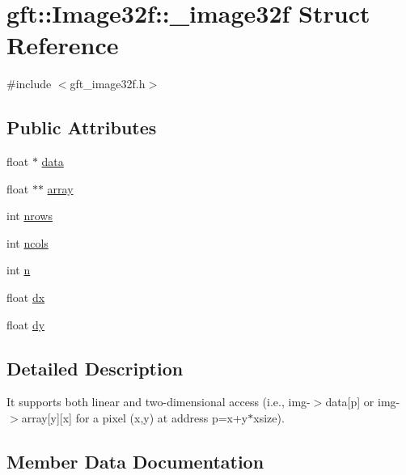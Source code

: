 \hypertarget{structgft_1_1Image32f_1_1__image32f}{}\section{gft\+:\+:Image32f\+:\+:\+\_\+image32f Struct Reference}
\label{structgft_1_1Image32f_1_1__image32f}


{\ttfamily \#include $<$gft\+\_\+image32f.\+h$>$}

\subsection*{Public Attributes}
\begin{DoxyCompactItemize}
\item 
float $\ast$ \hyperlink{structgft_1_1Image32f_1_1__image32f_acfb534bc753690f73f8611bb330b6981}{data}
\item 
float $\ast$$\ast$ \hyperlink{structgft_1_1Image32f_1_1__image32f_aebbb1419c99eba1ae8c14ae2fcb66ed3}{array}
\item 
int \hyperlink{structgft_1_1Image32f_1_1__image32f_ae048a9c4a6d33d48ce69da13cd0ecd15}{nrows}
\item 
int \hyperlink{structgft_1_1Image32f_1_1__image32f_aa5a18afe7e4363fa9ddcdf54a2126605}{ncols}
\item 
int \hyperlink{structgft_1_1Image32f_1_1__image32f_a537587a8a745eae8c71e6753af64d4e1}{n}
\item 
float \hyperlink{structgft_1_1Image32f_1_1__image32f_a93555e01aa1ad19a74079526cc033d1e}{dx}
\item 
float \hyperlink{structgft_1_1Image32f_1_1__image32f_a39c9ee2df99728fe7047f46e49721795}{dy}
\end{DoxyCompactItemize}


\subsection{Detailed Description}
It supports both linear and two-\/dimensional access (i.\+e., img-\/$>$data\mbox{[}p\mbox{]} or img-\/$>$array\mbox{[}y\mbox{]}\mbox{[}x\mbox{]} for a pixel (x,y) at address p=x+y$\ast$xsize). 

\subsection{Member Data Documentation}
